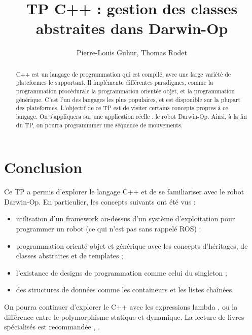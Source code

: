 \documentclass[runningheads,a4paper]{llncs}
\title{TP C++ : gestion des classes abstraites dans Darwin-Op}
\author{Pierre-Louis Guhur,  \inst{1}
        Thomas Rodet \inst{1}}
\institute{
ENS Paris-Saclay (France)
}
\newcommand*{\rootPath}{./}
\begin{document}
\maketitle

\begin{abstract}
C++ est un langage de programmation qui est compilé, avec une large variété de plateformes le supportant.
Il implémente différentes paradigmes, comme la programmation procédurale  la programmation orientée objet, et la programmation générique.
C'est l'un des langages les plus populaires, et est disponible sur la plupart des plateformes.
L'objectif de ce TP est de visiter certains concepts propres à ce langage.
On s'appliquera sur une application réelle : le robot Darwin-Op.
Ainsi, à la fin du TP, on pourra programmmer une séquence de mouvements.
\end{abstract}











\section{Conclusion}
\label{sec:ccl}


Ce TP a permis d'explorer le langage C++ et de se familiariser avec le robot Darwin-Op. En particulier, les concepts suivants ont été vus :
\begin{itemize}
    \item utilisation d'un framework au-dessus d'un système d'exploitation pour programmer un robot (ce qui n'est pas sans rappelé ROS) ;
    \item programmation orienté objet et générique avec les concepts d'héritages, de classes abstraites et de templates ;
    \item l'existance de designs de programmation comme celui du singleton ;
    \item des structures de données comme les containeurs et les listes chaînées.
\end{itemize}
On pourra continuer d'explorer le C++ avec les expressions lambda \cite{lambda}, ou la différence entre le polymorphisme statique et dynamique. La lecture de livres spécialisés est recommandée \cite{gamma1995design}, \cite{jumpingallain}. 




\ifstandalone

    \appendix
    \printglossary[title=Vocabulaire et abbréviations]
	
	
\fi
\end{document}
